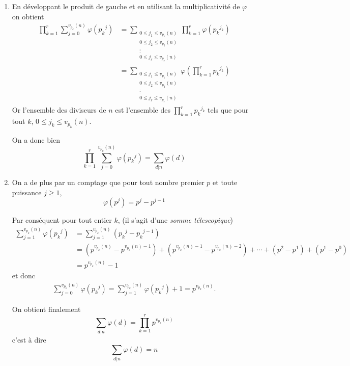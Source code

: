 \begin{sol}
\begin{enumerate}
\item  En développant le produit de gauche et en utilisant la multiplicativité de $\varphi$ on obtient
$$\begin{aligned}
  \prod_{k=1}^r \sum_{j=0}^{v_{p_k}(n)} \varphi({p_k}^j) & = \sum_{\substack{ 0 \le j_1 \le v_{p_1}(n) \\ 0 \le j_2 \le v_{p_2}(n) \\ \vdots\\  0 \le j_r \le v_{p_r}(n)
      }}\prod_{k=1}^r \varphi({p_k}^{j_k})                                                               \\
                                                          & = \sum_{\substack{ 0 \le j_1 \le v_{p_1}(n) \\ 0 \le j_2 \le v_{p_2}(n) \\ \vdots\\  0 \le j_r \le v_{p_r}(n)
      }}\varphi\left(\prod_{k=1}^r {p_k}^{j_k}\right)
\end{aligned} $$
Or l'ensemble des diviseurs de $n$ est l'ensemble des $\prod_{k=1}^r {p_k}^{j_k}$ tels que pour tout $k$, $0 \le j_k \le v_{p_k}(n)$.

On a donc bien
$$\boxed{\prod_{k=1}^r \sum_{j=0}^{v_{p_k}(n)} \varphi({p_k}^j) = \sum_{d | n} \varphi(d)}$$
\item On a de plus par un comptage que pour tout nombre premier $p$ et toute puissance $j\ge 1$,
$$\varphi(p^j) = p^j-p^{j-1}$$

Par conséquent pour tout entier $k$, (il s'agit d'une \emph{somme télescopique})
$$\begin{aligned}
  \sum_{j=1}^{v_{p_k}(n)} \varphi({p_k}^j) & = \sum_{j=1}^{v_{p_k}(n)} \left( {p_k}^j - {p_k}^{j-1}\right)                                                                                                         \\
                                          & = \left(p^{v_{p_k}(n)} - p^{v_{p_k}(n)-1}\right) + \left(p^{v_{p_k}(n)-1} - p^{v_{p_k}(n)-2}\right) + \cdots + \left(p^{2} - p^{1}\right)+ \left(p^{1} - p^{0}\right) \\
                                          & = p^{v_{p_k}(n)}-1
\end{aligned} $$
et donc
$$\begin{aligned}
  \sum_{j=0}^{v_{p_k}(n)} \varphi({p_k}^j) = \sum_{j=1}^{v_{p_k}(n)} \varphi({p_k}^j) +1  = p^{v_{p_k}(n)}.
\end{aligned}$$

On obtient finalement
$$ \sum_{d | n} \varphi(d) = \prod_{k=1}^r p^{v_{p_k}(n)}$$
c'est à dire
$$\boxed{ \sum_{d | n} \varphi(d) = n}$$
\end{enumerate}
\end{sol}

